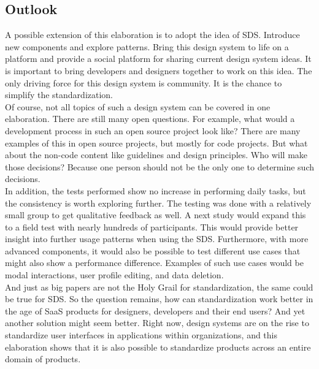\subsection{Outlook}
A possible extension of this elaboration is to adopt the idea of \ac{SDS}. Introduce new components and explore patterns. Bring this design system to life on a platform and provide a social platform for sharing current design system ideas. It is important to bring developers and designers together to work on this idea. The only driving force for this design system is community. It is the chance to simplify the standardization. \\
Of course, not all topics of such a design system can be covered in one elaboration. There are still many open questions. For example, what would a development process in such an open source project look like? There are many examples of this in open source projects, but mostly for code projects. But what about the non-code content like guidelines and design principles. Who will make those decisions? Because one person should not be the only one to determine such decisions. \\
In addition, the tests performed show no increase in performing daily tasks, but the consistency is worth exploring further. The testing was done with a relatively small group to get qualitative feedback as well. A next study would expand this to a field test with nearly hundreds of participants. This would provide better insight into further usage patterns when using the \ac{SDS}. Furthermore, with more advanced components, it would also be possible to test different use cases that might also show a performance difference. Examples of such use cases would be modal interactions, user profile editing, and data deletion. \\
And just as big papers are not the Holy Grail for standardization, the same could be true for \ac{SDS}. So the question remains, how can standardization work better in the age of \ac{SaaS} products for designers, developers and their end users? And yet another solution might seem better. Right now, design systems are on the rise to standardize user interfaces in applications within organizations, and this elaboration shows that it is also possible to standardize products across an entire domain of products. 